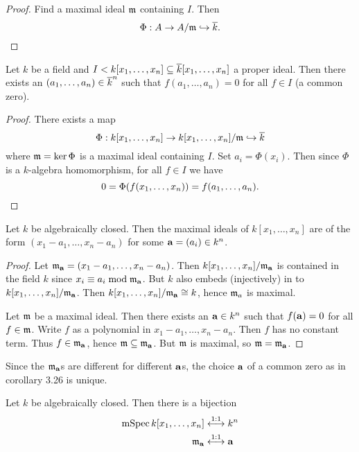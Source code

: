 \begin{proof}
  Find a maximal ideal $\mathfrak{m}$ containing $I$.
  Then
  \[ \Phi: A \to A/\mathfrak{m} \hookrightarrow \overline k. \qedhere \]
\end{proof}

\begin{cor}[3.26]
  Let $k$ be a field and $I < k[x_1,\ldots,x_n] \subseteq \overline k[x_1,\ldots,x_n]$ a proper ideal.
  Then there exists an $(a_1,\ldots,a_n) \in \overline k^n$ such that $f(a_1,\ldots,a_n)=0$ for all $f \in I$ (a common zero).
\end{cor}

\begin{proof}
  There exists a map
  \[ \Phi: k[x_1,\ldots,x_n] \to k[x_1,\ldots,x_n]/\mathfrak{m} \hookrightarrow \overline k \]
  where $\mathfrak{m}=\ker\Phi$ is a maximal ideal containing $I$.
  Set $a_i=\Phi(x_i)$.
  Then since $\Phi$ is a $k$-algebra homomorphism, for all $f \in I$ we have
  \[ 0 = \Phi(f(x_1,\ldots,x_n)) = f(a_1,\ldots,a_n). \qedhere \]
\end{proof}

\begin{cor}[3.27]
  Let $k$ be algebraically closed.
  Then the maximal ideals of $k[x_1,\ldots,x_n]$ are of the form $(x_1-a_1,\ldots,x_n-a_n)$ for some $\mathbf{a} = (a_i) \in k^n$.
\end{cor}

\begin{proof}
  Let $\mathfrak{m}_{\mathbf{a}} = (x_1-a_1,\ldots,x_n-a_n)$.
  Then $k[x_1,\ldots,x_n]/\mathfrak{m}_{\mathbf{a}}$ is contained in the field $k$ since $x_i \equiv a_i \bmod \mathfrak{m}_{\mathbf{a}}$.
  But $k$ also embeds (injectively) in to $k[x_1,\ldots,x_n]/\mathfrak{m}_{\mathbf{a}}$.
  Then $k[x_1,\ldots,x_n]/\mathfrak{m}_{\mathbf{a}} \cong k$, hence $\mathfrak{m}_a$ is maximal.

  Let $\mathfrak{m}$ be a maximal ideal.
  Then there exists an $\mathbf{a} \in k^n$ such that $f(\mathbf{a})=0$ for all $f \in \mathfrak{m}$.
  Write $f$ as a polynomial in $x_1-a_1,\ldots,x_n-a_n$.
  Then $f$ has no constant term.
  Thus $f \in \mathfrak{m}_{\mathbf{a}}$, hence $\mathfrak{m} \subseteq \mathfrak{m}_{\mathbf{a}}$.
  But $\mathfrak{m}$ is maximal, so $\mathfrak{m} = \mathfrak{m}_{\mathbf{a}}$.
\end{proof}

\begin{rmk}
  Since the $\mathfrak{m}_{\mathbf{a}}$s are different for different $\mathbf{a}$s, the choice $\mathbf{a}$ of a common zero as in corollary 3.26 is unique.
\end{rmk}

\begin{cor}[3.28]
  Let $k$ be algebraically closed.
  Then there is a bijection
  \begin{align*}
    \operatorname{mSpec} k[x_1,\ldots,x_n] &\overset{1:1}{\longleftrightarrow} k^n \\
    \mathfrak{m}_{\mathbf{a}} &\overset{1:1}{\longleftrightarrow} \mathbf{a}
  \end{align*}
\end{cor}

